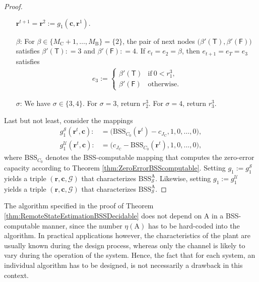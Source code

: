 \documentclass[conference]{IEEEtran}
\def\G{{\mathcal G}}
\def\S{{\mathcal S}}
\def\U{{\mathcal U}}
\def\mA{\bm{\mathrm{A}}}
\newcommand{\BSS}{\mathrm{BSS}}
\begin{document}
\begin{proof}
\begin{enumerate}
											\(\bm{r}^{t+1} = \bm{r}^{2} := g_1(\bm{c},\bm{r}^1).
											\)
										\item[\(\beta\)\hspace{1pt}:] 
											For \(\beta \in \{M_\mathrm{C} + 1,\ldots, M_\mathrm{B}\} = \{2\}\), the pair of next nodes \(\big(\beta'(\mathsf{T}),
											\beta'(\mathsf{F})\big)\) satisfies
											\(\beta'(\mathsf{T}) :    =  3\) and \(\beta'(\mathsf{F}) :    =  4\).
											If \(e_t = e_2 = \beta\), then \(e_{t+1} = e_T = e_3\) satisfies
											\begin{align*}   e_{3} := 	\begin{cases}   \beta'(\mathsf{T}) &\text{if}~ 0 < r_1^3,\\
																						\beta'(\mathsf{F}) &\text{otherwise}.
																		\end{cases}
											\end{align*}
										\item[\(\sigma\)\hspace{1pt}:] We have \(\sigma \in \{3,4\}\). For \(\sigma = 3\), return \(r_2^3\). For \(\sigma = 4\), return \(r_3^3\).
					\end{enumerate}
					Last but not least, consider the mappings
					\begin{align*}	g_1^\S(\bm{r}^t,\bm{c}) :&= \big(\BSS_{C_0}(\bm{r}^t) - c_{J_\mathrm{C}}, 1, 0, \ldots, 0\big), \\
									g_1^\U(\bm{r}^t,\bm{c}) :&= \big(c_{J_\mathrm{C}} - \BSS_{C_0}(\bm{r}^t), 1, 0, \ldots, 0\big), 
					\end{align*}
					where \(\BSS_{C_0}\) denotes the BSS-computable mapping that computes the zero-error capacity according to Theorem \ref{thm:ZeroErrorBSScomputable}. 
					Setting \(g_1 := g_1^\S\) yields a triple \((\bm{r}, \bm{c}, \G)\)
					that characterizes \(\BSS_{\S}^{\mA}\). Likewise, setting \(g_1 := g_1^\U\) yields a triple \((\bm{r}, \bm{c}, \G)\)
					that characterizes \(\BSS_{\S}^{\mA}\).
	\end{proof}
	
	The algorithm specified in the proof of Theorem \ref{thm:RemoteStateEstimationBSSDecidable} does not depend on \(\mA\) in a BSS-computable manner,
	since the number \(\eta(\mA)\) has to be hard-coded into the algorithm. In practical applications however, the characteristics of the plant
	are usually known during the design process, whereas only the channel is likely to vary during the operation
	of the system. Hence, the fact that for each system, an individual algorithm has to be designed, is not necessarily a drawback in this context.
	
\end{document}

